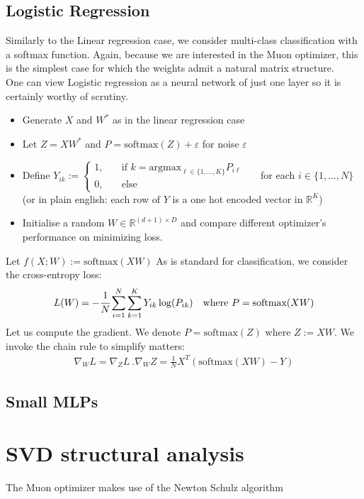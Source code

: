\documentclass[12pt]{book}
\newcommand{\R}{\mathbb{R}}
\begin{document}
\subsection{Logistic Regression}
Similarly to the Linear regression case, we consider multi-class classification with a softmax function. Again, because we are interested in the Muon optimizer, this is the simplest case for which the weights admit a natural matrix structure. 
\\
One can view Logistic regression as a neural network of just one layer so it is certainly worthy of scrutiny.  
\begin{itemize}
\item Generate $X$ and  $W^*$ as in the linear regression case
\item  Let $Z = XW^*$ and  $P = \text{softmax}(Z) + \varepsilon $ for noise $\varepsilon $
\item  Define $Y_{ik} := \begin{cases}
		1, \quad &\text{if $k = \text{argmax}_{\ell \in \{1,\ldots,K\} } P_{i\ell} $}\\
		0, &\text{else}
\end{cases}$\ \ \  for each $i \in\{1,\ldots,N\} $ (or in plain english: each row of $Y$ is a one hot encoded vector in $\R^{K}$)
\item Initialise a random $W\in \R^{(d+1) \times D}$ and compare different optimizer's performance on minimizing loss. 
\end{itemize}
Let $f(X ; W) := \text{softmax}(XW)$
As is standard for classification, we consider the cross-entropy loss:
\[
L(W) = - \cfrac{1}{N} \sum_{i = 1}^{N} \sum_{k=1}^{K} {Y_{ik} \log(P_{ik})} \quad \text{where } P = \text{softmax}(XW)
\]
Let us compute the gradient. We denote $P = \text{softmax}(Z)$  where $Z := XW$. We invoke the chain rule to simplify matters: 
\begin{align*}
\nabla_W L = \nabla_Z L\  . \nabla_W Z = \frac{1}{N} X^{T} (\text{softmax}(XW) - Y)
\end{align*}
\subsection{Small MLPs}
\section{SVD structural analysis}
The Muon optimizer makes use of the Newton Schulz algorithm 
\end{document}
